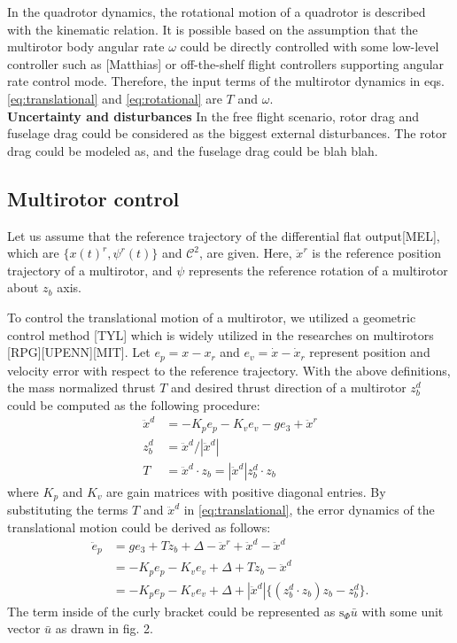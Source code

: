 \documentclass[letterpaper, 10 pt, conference]{ieeeconf}  %
\begin{document}
In the quadrotor dynamics, the rotational motion of a quadrotor is described with the kinematic relation. 
It is possible based on the assumption that the multirotor body angular rate $\omega$ could be directly controlled with some low-level controller such as [Matthias] or off-the-shelf flight controllers supporting angular rate control mode.
Therefore, the input terms of the multirotor dynamics in eqs. \eqref{eq:translational} and \eqref{eq:rotational} are $T$ and $\omega$.
\\
\textbf{Uncertainty and disturbances}
In the free flight scenario, rotor drag and fuselage drag could be considered as the biggest external disturbances.
The rotor drag could be modeled as, and the fuselage drag could be blah blah.

\subsection{Multirotor control} \label{sec:controller}
Let us assume that the reference trajectory of the differential flat output[MEL], which are $\{x(t)^r,\psi^r(t)\}$ and $\mathcal{C}^2$, are given.
Here, $\ddot{x}^r$ is the reference position trajectory of a multirotor, and $\psi$ represents the reference rotation of a multirotor about $z_b$ axis.

To control the translational motion of a multirotor, we utilized a geometric control method [TYL] which is widely utilized in the researches on multirotors [RPG][UPENN][MIT].
Let $e_p = x - x_r$ and $e_v = \dot{x} - \dot{x}_r$ represent position and velocity error with respect to the reference trajectory.
With the above definitions, the mass normalized thrust $T$  and desired thrust direction of a multirotor $z_b^d$ could be computed as the following procedure:
\begin{align}
\ddot{x}^{d} &= -K_p e_p - K_v e_v -ge_3 + \ddot{x}^r \nonumber \\
z_b^{d} &= \ddot{x}^{d}/|\ddot{x}^{d}| \nonumber \\
T &= \ddot{x}^{d}\cdot z_b = |\ddot{x}^{d}|z_b^d \cdot z_b \nonumber 
\end{align}
where $K_p$ and $K_v$ are gain matrices with positive diagonal entries.
By substituting the terms $T$ and $\ddot{x}^d$ in \eqref{eq:translational}, the error dynamics of the translational motion could be derived as follows:
\begin{align}
\ddot{e}_p &= ge_3 + Tz_b + \Delta - \ddot{x}^r + \ddot{x}^d - \ddot{x}^d \nonumber \\
&= -K_pe_p -K_ve_v + \Delta + Tz_b - \ddot{x}^d \nonumber \\
&= -K_pe_p -K_ve_v + \Delta + |\ddot{x}^d|\{(z_b^d\cdot z_b)z_b - z_b^d\}. \label{eq:translationalError1}
\end{align}
The term inside of the curly bracket could be represented as $\text{s}_\Phi \bar{u}$ with some unit vector $\bar{u}$ as drawn in fig. 2.
\end{document}
